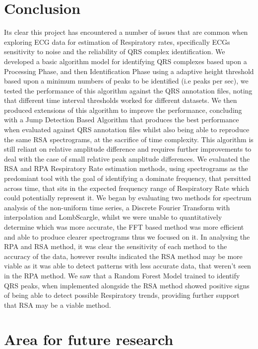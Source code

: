 \section{Conclusion}
Its clear this project has encountered a number of issues that are common when exploring 
ECG data for estimation of Respiratory rates, specifically ECGs sensitivity to noise and the reliability of QRS complex identification. 
We developed a basic algorithm model for identifying QRS complexes based upon a Processing Phase, and then 
Identification Phase using a adaptive height threshold based upon a minimum numbers of peaks to be identified (i.e peaks per sec), we tested the performance of this algorithm against the QRS annotation 
files, noting that different time interval thresholds worked for different datasets. We then produced extensions of this algorithm to improve 
the performance, concluding with a Jump Detection Based Algorithm that produces the best performance when evaluated against 
QRS annotation files whilst also being able to reproduce the same RSA spectrograms, at the sacrifice 
of time complexity. This algorithm is still reliant on relative amplitude difference and requires further improvements to deal 
with the case of small relative peak amplitude differences.  We evaluated the RSA and RPA Respiratory Rate estimation methods, using spectrograms as the predomiant tool with the goal 
of identifying a dominate frequency, that persitted across time, that sits in the expected frequency range of Respiratory Rate
which could potentially represent it. We began by evaluating two methods 
for spectrum analysis of the non-uniform time series, a Discrete Fourier Transform with interpolation and LombScargle, whilst we were unable to quantitatively
determine which was more accurate,  the FFT based method was more efficient and able to produce clearer spectrograms thus we focused on it. In analysing the RPA and RSA method, 
it was clear the sensitivity of each method to the accuracy of the data, however results indicated the RSA method 
may be more viable as it was able to detect patterns with less accurate data, that weren't seen in the RPA method. We saw 
that a Random Forest Model trained to identify QRS peaks, when implemented alongside the RSA method showed positive signs of 
being able to detect possible Respiratory trends, providing further support that RSA may be a viable method. 

\section{Area for future research}

